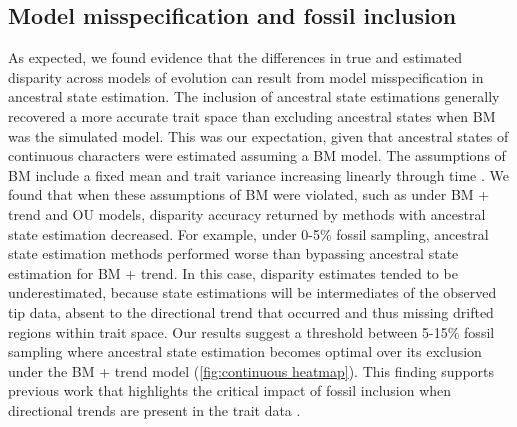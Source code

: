 \documentclass[11pt, a4paper]{article}
\newcommand{\ase}{ancestral state estimation }
\begin{document}
\subsection{Model misspecification and fossil inclusion}
As expected, we found evidence that the differences in true and estimated disparity across models of evolution can result from model misspecification in ancestral state estimation.
The inclusion of ancestral state estimations generally recovered a more accurate trait space than excluding ancestral states when BM was the simulated model.
This was our expectation, given that ancestral states of continuous characters were estimated assuming a BM model.
The assumptions of BM include a fixed mean and trait variance increasing linearly through time \citep{felsenstein1985phylogenies,omeara2006testing}.
We found that when these assumptions of BM were violated, such as under BM + trend and OU models, disparity accuracy returned by methods with \ase decreased.
For example, under 0-5\% fossil sampling, \ase methods performed worse than bypassing \ase for BM + trend.
In this case, disparity estimates tended to be underestimated, because state estimations will be intermediates of the observed tip data, absent to the directional trend that occurred and thus missing drifted regions within trait space.
Our results suggest a threshold between 5-15\% fossil sampling where \ase becomes optimal over its exclusion under the BM + trend model (\autoref{fig:continuous heatmap}).
This finding supports previous work that highlights the critical impact of fossil inclusion when directional trends are present in the trait data \citep{finarelli2006ancestral,albert2009fossils,slater2012integrating,finarelli2013potential,gearty2024impact}.
\end{document}

